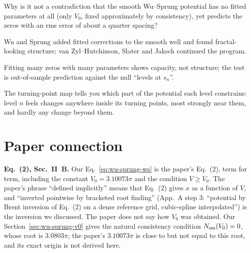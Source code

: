 \begin{checkpoint}
Why is it not a contradiction that the smooth Wu--Sprung potential has no fitted parameters at all (only $V_0$, fixed approximately by consistency), yet predicts the zeros with an rms error of about a quarter spacing?
\end{checkpoint}

\begin{keyideas}
\item Wu and Sprung added fitted corrections to the smooth well and found fractal-looking structure; van Zyl--Hutchinson, Slater and Jaksch continued the program.
\item Fitting many zeros with many parameters shows capacity, not structure; the test is out-of-sample prediction against the null ``levels at $s_n$''.
\item The turning-point map tells you which part of the potential each level constrains: level $n$ feels changes anywhere inside its turning points, most strongly near them, and hardly any change beyond them.
\end{keyideas}

\section{Paper connection}\label{sec:wu-sprung-paper}

\textbf{Eq.~(2), Sec.~II~B.} Our Eq.~\eqref{eq:wu-sprung-ws} is the paper's Eq.~(2), term for term, including the constant $V_0=3.10073\pi$ and the condition $V\ge V_0$. The paper's phrase ``defined implicitly'' means that Eq.~(2) gives $x$ as a function of $V$, and ``inverted pointwise by bracketed root finding'' (App.~A step 3: ``potential by Brent inversion of Eq.~(2) on a dense reference grid, cubic-spline interpolated'') is the inversion we discussed. The paper does not say how $V_0$ was obtained. Our Section~\ref{sec:wu-sprung-v0} gives the natural consistency condition $N_{\mathrm{sm}}(V_0)=0$, whose root is $3.0803\pi$; the paper's $3.10073\pi$ is close to but not equal to this root, and its exact origin is not derived here.

